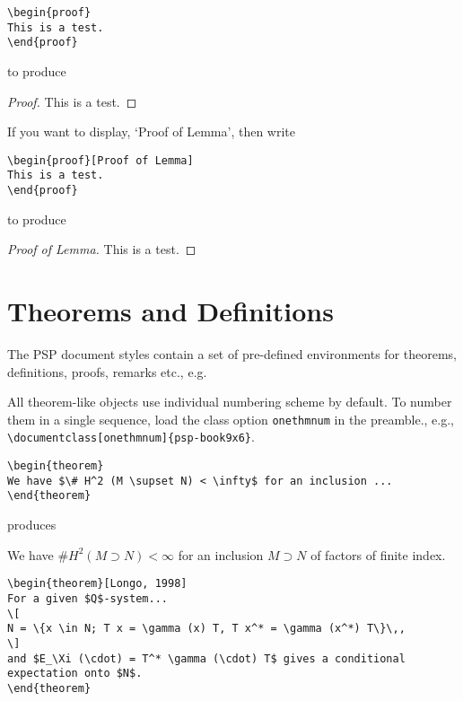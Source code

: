 \begin{verbatim}
\begin{proof}
This is a test.
\end{proof}
\end{verbatim}

\noindent to produce

\begin{proof}
This is a test.
\end{proof}

If you want to display, `Proof of Lemma', then write

\begin{verbatim}
\begin{proof}[Proof of Lemma]
This is a test.
\end{proof}
\end{verbatim}

\noindent to produce

\begin{proof}[Proof of Lemma]
This is a test.
\end{proof}

\section{Theorems and Definitions}
The PSP document styles contain a set of pre-defined environments
for theorems, definitions, proofs, remarks etc., e.g.

All theorem-like objects use individual numbering scheme by default.
To number them in a single sequence, load the class option
\verb|onethmnum| in the preamble., e.g.,
\verb|\documentclass[onethmnum]{psp-book9x6}|.

\begin{verbatim}
\begin{theorem}
We have $\# H^2 (M \supset N) < \infty$ for an inclusion ...
\end{theorem}
\end{verbatim}

\noindent produces

\begin{theorem}
We have $\# H^2 (M \supset N) < \infty$ for an inclusion $M \supset
N$ of factors of finite index.
\end{theorem}

\begin{verbatim}
\begin{theorem}[Longo, 1998]
For a given $Q$-system...
\[
N = \{x \in N; T x = \gamma (x) T, T x^* = \gamma (x^*) T\}\,,
\]
and $E_\Xi (\cdot) = T^* \gamma (\cdot) T$ gives a conditional
expectation onto $N$.
\end{theorem}
\end{verbatim}

